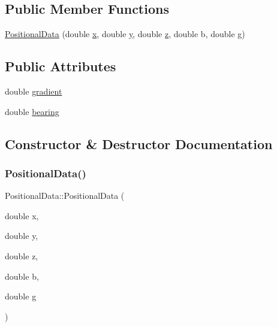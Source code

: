 \subsection*{Public Member Functions}
\begin{DoxyCompactItemize}
\item 
\hyperlink{class_positional_data_a31b77f08d0a18c72e3b21cac6bc2d095}{Positional\+Data} (double \hyperlink{class_vector2_d_ac5c4e553815737aa24bec8281270178f}{x}, double \hyperlink{class_vector2_d_ac38d0179cfe74c30fee290a703ab209a}{y}, double \hyperlink{class_vector3_d_a7321f3ff785f275c4d83f7d1b951752a}{z}, double b, double g)
\end{DoxyCompactItemize}
\subsection*{Public Attributes}
\begin{DoxyCompactItemize}
\item 
double \hyperlink{class_positional_data_a2aa73f7333432a8b32d2036f4c940ff3}{gradient}
\item 
double \hyperlink{class_positional_data_a2ae5a622a025a392acfb29c66e6c310e}{bearing}
\end{DoxyCompactItemize}


\subsection{Constructor \& Destructor Documentation}
\mbox{\label{class_positional_data_a31b77f08d0a18c72e3b21cac6bc2d095}} 
\subsubsection{\texorpdfstring{Positional\+Data()}{PositionalData()}}
{\footnotesize\ttfamily Positional\+Data\+::\+Positional\+Data (\begin{DoxyParamCaption}\item[{double}]{x,  }\item[{double}]{y,  }\item[{double}]{z,  }\item[{double}]{b,  }\item[{double}]{g }\end{DoxyParamCaption})\hspace{0.3cm}{\ttfamily [inline]}}



